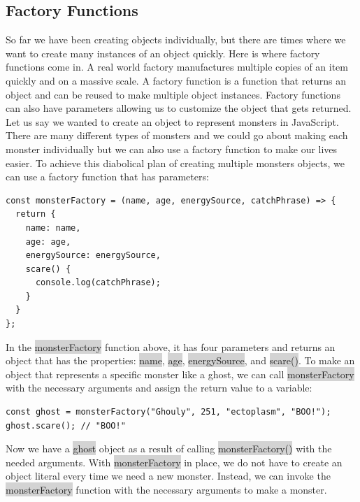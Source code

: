 \documentclass[11pt]{article}
\begin{document}
\subsection{Factory Functions}
So far we have been creating objects individually, but there are times where we want to create many instances of an object quickly. Here is where factory functions come in. A real world factory manufactures multiple copies of an item quickly and on a massive scale. A factory function is a function that returns an object and can be reused to make multiple object instances. Factory functions can also have parameters allowing us to customize the object that gets returned. \\
\newline
Let us say we wanted to create an object to represent monsters in JavaScript. There are many different types of monsters and we could go about making each monster individually but we can also use a factory function to make our lives easier. To achieve this diabolical plan of creating multiple monsters objects, we can use a factory function that has parameters: 
\begin{lstlisting}
const monsterFactory = (name, age, energySource, catchPhrase) => {
  return { 
    name: name,
    age: age, 
    energySource: energySource,
    scare() {
      console.log(catchPhrase);
    } 
  }
};
\end{lstlisting}
In the \colorbox{lightgray}{monsterFactory} function above, it has four parameters and returns an object that has the properties: \colorbox{lightgray}{name}, \colorbox{lightgray}{age}, \colorbox{lightgray}{energySource}, and \colorbox{lightgray}{scare()}. To make an object that represents a specific monster like a ghost, we can call \colorbox{lightgray}{monsterFactory} with the necessary arguments and assign the return value to a variable:
\begin{lstlisting}
const ghost = monsterFactory("Ghouly", 251, "ectoplasm", "BOO!");
ghost.scare(); // "BOO!"
\end{lstlisting}
Now we have a \colorbox{lightgray}{ghost} object as a result of calling \colorbox{lightgray}{monsterFactory()} with the needed arguments. With \colorbox{lightgray}{monsterFactory} in place, we do not have to create an object literal every time we need a new monster. Instead, we can invoke the \colorbox{lightgray}{monsterFactory} function with the necessary arguments to make a monster. 
\end{document}
